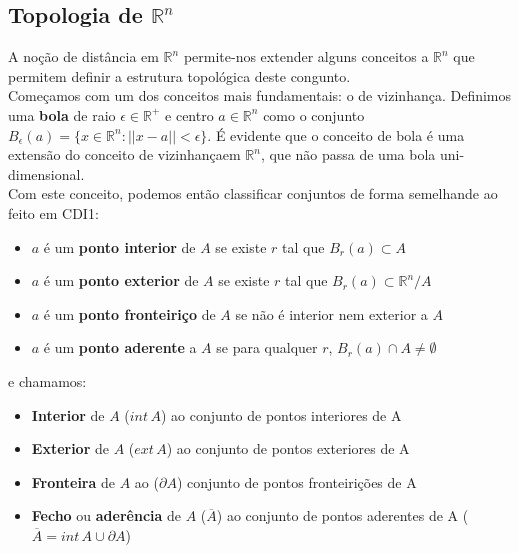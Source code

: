 \documentclass{article}
\begin{document}
\subsection{Topologia de $\mathbb{R}^n$}
A noção de distância em $\mathbb{R}^n$ permite-nos extender alguns conceitos a $\mathbb{R}^n$ que permitem definir a estrutura topológica deste congunto.\\
Começamos com um dos conceitos mais fundamentais: o de vizinhança. Definimos uma \textbf{bola} de raio $\epsilon \in \mathbb{R}^+$ e centro $a \in \mathbb{R}^n$ como o conjunto $B_\epsilon(a) = \{ x \in \mathbb{R}^n : ||x-a|| < \epsilon \}$. É evidente que o conceito de bola é uma extensão do conceito de vizinhançaem $\mathbb{R}^n$, que não passa de uma bola uni-dimensional.\\
Com este conceito, podemos então classificar conjuntos de forma semelhande ao feito em CDI1:
\begin{itemize}
\item $a$ é um \textbf{ponto interior} de $A$ se existe $r$ tal que $B_r(a) \subset A$ \vspace{-0.8mm}
\item $a$ é um \textbf{ponto exterior} de $A$ se existe $r$ tal que $B_r(a) \subset \mathbb{R}^n/A$ \vspace{-0.8mm}
\item $a$ é um \textbf{ponto fronteiriço} de $A$ se não é interior nem exterior a $A$ \vspace{-0.8mm}
\item $a$ é um \textbf{ponto aderente} a $A$ se para qualquer $r$, $B_r(a) \cap A \neq \emptyset$ \vspace{-0.8mm}
\end{itemize}
e chamamos: \vspace{-0.8mm}
\begin{itemize}
\item \textbf{Interior} de $A$ ($int \, A$) ao conjunto de pontos interiores de A \vspace{-0.8mm}
\item \textbf{Exterior} de $A$ ($ext \, A$) ao conjunto de pontos exteriores de A \vspace{-0.8mm}
\item \textbf{Fronteira} de $A$ ao ($\partial A$) conjunto de pontos fronteirições de A \vspace{-0.8mm}
\item \textbf{Fecho} ou \textbf{aderência} de $A$ ($\overline{A}$) ao conjunto de pontos aderentes de A ($\overline{A}=int \, A \cup \partial A$) \vspace{-0.8mm}
\end{itemize}
\end{document}
